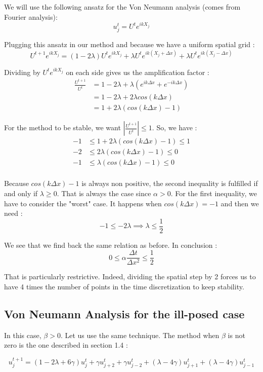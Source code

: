 We will use the following ansatz for the Von Neumann analysis (comes from Fourier analysis):
$$u_j^t = U^te^{ikX_j}$$

Plugging this ansatz in our method and because we have a uniform spatial grid : 
$$U^{t+1}e^{ikX_j} = (1-2\lambda)U^te^{ikX_j} + \lambda U^t e^{ik(X_j+\Delta x)}+ \lambda U^t e^{ik(X_j-\Delta x)}$$

Dividing by $U^t e^{ikX_j}$ on each side gives us the amplification factor :
\begin{align*}
\frac{U^{t+1}}{U^t} &= 1-2\lambda + \lambda (e^{ik\Delta x} + e^{-ik\Delta x})\\
&= 1-2\lambda +2\lambda cos(k\Delta x)\\
&= 1 + 2\lambda (cos(k\Delta x) -1)
\end{align*}

For the method to be stable, we want $|\frac{U^{t+1}}{U^t}| \leq 1$. So, we have :
\begin{align*}
-1 &\leq 1 + 2\lambda (cos(k\Delta x) -1) \leq 1\\
-2 &\leq 2\lambda (cos(k\Delta x) -1) \leq 0\\
-1 &\leq \lambda (cos(k\Delta x) -1) \leq 0\\
\end{align*}

Because $cos(k\Delta x) -1$ is always non positive, the second inequality is fulfilled if and only if $\lambda \geq 0$. That is always the case since $\alpha >0$. For the first inequality, we have to consider the "worst" case. It happens when $cos(k\Delta x) = -1$ and then we need : 
$$-1 \leq -2 \lambda \implies \lambda \leq \frac{1}{2} $$

We see that we find back the same relation as before. In conclusion : 
$$0 \leq \alpha \frac{\Delta t }{\Delta x^2} \leq \frac{1}{2}$$

That is particularly restrictive. Indeed, dividing the spatial step by 2 forces us to have 4 times the number of points in the time discretization to keep stability.

\subsection{Von Neumann Analysis for the ill-posed case}
In this case, $\beta > 0$. Let us use the same technique. The method when $\beta$ is not zero is the one described in section 1.4 : 

$$u_j^{t+1} = (1-2\lambda+6\gamma)u_j^t + \gamma u_{j+2}^t + \gamma u_{j-2}^t + (\lambda - 4\gamma)u_{j+1}^t + (\lambda - 4\gamma)u_{j-1}^t$$

